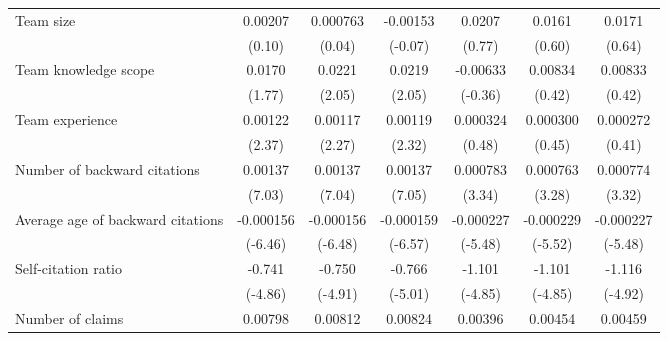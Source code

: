 \begin{sidewaystable}[h!]
{\begin{tabular}{l*{6}{c}}
\addlinespace
Team size           &     0.00207         &    0.000763         &    -0.00153         &      0.0207         &      0.0161         &      0.0171         \\
                    &      (0.10)         &      (0.04)         &     (-0.07)         &      (0.77)         &      (0.60)         &      (0.64)         \\
\addlinespace
Team knowledge scope&      0.0170\sym{+}  &      0.0221\sym{*}  &      0.0219\sym{*}  &    -0.00633         &     0.00834         &     0.00833         \\
                    &      (1.77)         &      (2.05)         &      (2.05)         &     (-0.36)         &      (0.42)         &      (0.42)         \\
\addlinespace
Team experience     &     0.00122\sym{*}  &     0.00117\sym{*}  &     0.00119\sym{*}  &    0.000324         &    0.000300         &    0.000272         \\
                    &      (2.37)         &      (2.27)         &      (2.32)         &      (0.48)         &      (0.45)         &      (0.41)         \\
\addlinespace
Number of backward citations&     0.00137\sym{***}&     0.00137\sym{***}&     0.00137\sym{***}&    0.000783\sym{***}&    0.000763\sym{**} &    0.000774\sym{***}\\
                    &      (7.03)         &      (7.04)         &      (7.05)         &      (3.34)         &      (3.28)         &      (3.32)         \\
\addlinespace
Average age of backward citations&   -0.000156\sym{***}&   -0.000156\sym{***}&   -0.000159\sym{***}&   -0.000227\sym{***}&   -0.000229\sym{***}&   -0.000227\sym{***}\\
                    &     (-6.46)         &     (-6.48)         &     (-6.57)         &     (-5.48)         &     (-5.52)         &     (-5.48)         \\
\addlinespace
Self-citation ratio &      -0.741\sym{***}&      -0.750\sym{***}&      -0.766\sym{***}&      -1.101\sym{***}&      -1.101\sym{***}&      -1.116\sym{***}\\
                    &     (-4.86)         &     (-4.91)         &     (-5.01)         &     (-4.85)         &     (-4.85)         &     (-4.92)         \\
\addlinespace
Number of claims    &     0.00798\sym{*}  &     0.00812\sym{*}  &     0.00824\sym{*}  &     0.00396         &     0.00454         &     0.00459         \\

\end{tabular}}
\end{sidewaystable}
